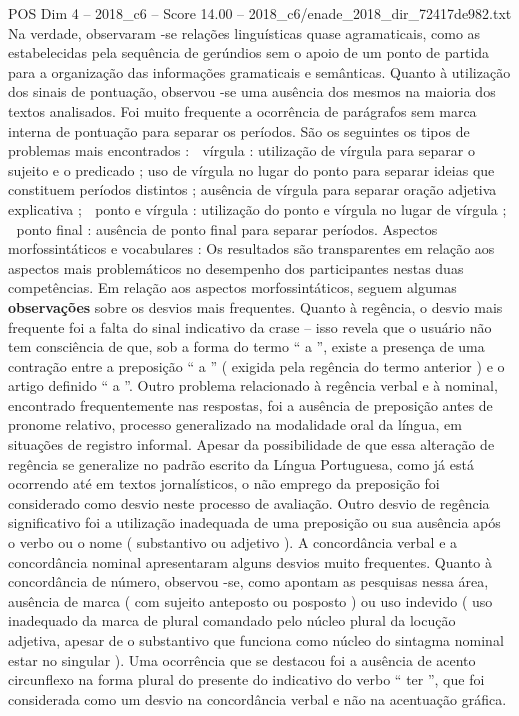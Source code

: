 \begin{textsample}{POS Dim 4 – 2018\_c6 – Score 14.00 – 2018\_c6/enade\_2018\_dir\_72417de982.txt}
Na verdade, observaram -se relações linguísticas quase agramaticais, como as estabelecidas pela sequência de gerúndios sem o apoio de um ponto de partida para a organização das informações gramaticais e semânticas.
Quanto à utilização dos sinais de pontuação, observou -se uma ausência dos mesmos na maioria dos textos analisados.
Foi muito frequente a ocorrência de parágrafos sem marca interna de pontuação para separar os períodos.
São os seguintes os tipos de problemas mais encontrados :  vírgula : utilização de vírgula para separar o sujeito e o predicado ; uso de vírgula no lugar do ponto para separar ideias que constituem períodos distintos ; ausência de vírgula para separar oração adjetiva explicativa ;  ponto e vírgula : utilização do ponto e vírgula no lugar de vírgula ;  ponto final : ausência de ponto final para separar períodos.
Aspectos morfossintáticos e vocabulares : Os resultados são transparentes em relação aos aspectos mais problemáticos no desempenho dos participantes nestas duas competências.
Em relação aos aspectos morfossintáticos, seguem algumas \textbf{observações} sobre os desvios mais frequentes.
Quanto à regência, o desvio mais frequente foi a falta do sinal indicativo da crase – isso revela que o usuário não tem consciência de que, sob a forma do termo “ a ”, existe a presença de uma contração entre a preposição “ a ” ( exigida pela regência do termo anterior ) e o artigo definido “ a ”.
Outro problema relacionado à regência verbal e à nominal, encontrado frequentemente nas respostas, foi a ausência de preposição antes de pronome relativo, processo generalizado na modalidade oral da língua, em situações de registro informal.
Apesar da possibilidade de que essa alteração de regência se generalize no padrão escrito da Língua Portuguesa, como já está ocorrendo até em textos jornalísticos, o não emprego da preposição foi considerado como desvio neste processo de avaliação.
Outro desvio de regência significativo foi a utilização inadequada de uma preposição ou sua ausência após o verbo ou o nome ( substantivo ou adjetivo ).
A concordância verbal e a concordância nominal apresentaram alguns desvios muito frequentes.
Quanto à concordância de número, observou -se, como apontam as pesquisas nessa área, ausência de marca ( com sujeito anteposto ou posposto ) ou uso indevido ( uso inadequado da marca de plural comandado pelo núcleo plural da locução adjetiva, apesar de o substantivo que funciona como núcleo do sintagma nominal estar no singular ).
Uma ocorrência que se destacou foi a ausência de acento circunflexo na forma plural do presente do indicativo do verbo “ ter ”, que foi considerada como um desvio na concordância verbal e não na acentuação gráfica.

\end{textsample}
